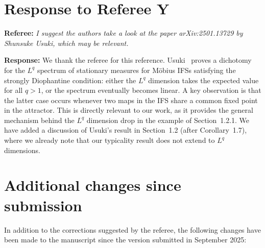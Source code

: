 \documentclass[11pt]{article}
\newcommand{\referee}[1]{\textbf{Referee:} \textit{#1}}
\newcommand{\response}[1]{\textbf{Response:} #1}
\begin{document}
\part*{Response to Referee Y}

\referee{I suggest the authors take a look at the paper arXiv:2501.13729 by Shunsuke Usuki, which may be relevant.}

\response{We thank the referee for this reference. Usuki~\cite{Usuki_LqMobius25arXiv} proves a
dichotomy for the $L^q$ spectrum of stationary measures for M\"obius IFSs satisfying the strongly
Diophantine condition: either the $L^q$ dimension takes the expected value for all $q>1$, or the
spectrum eventually becomes linear. A key observation is that the latter case occurs whenever two
maps in the IFS share a common fixed point in the attractor. This is directly relevant to our work,
as it provides the general mechanism behind the $L^q$ dimension drop in the example of
Section~1.2.1. We have added a discussion of Usuki's result in Section~1.2 (after Corollary~1.7),
where we already note that our typicality result does not extend to $L^q$ dimensions.}




\part*{Additional changes since submission}

In addition to the corrections suggested by the referee, the following changes have been made to the
manuscript since the version submitted in September 2025:
\end{document}
